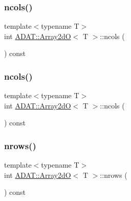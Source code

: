 \subsubsection{\texorpdfstring{ncols()}{ncols()}\hspace{0.1cm}{\footnotesize\ttfamily [1/2]}}
{\footnotesize\ttfamily template$<$typename T$>$ \\
int \mbox{\hyperlink{classADAT_1_1Array2dO}{A\+D\+A\+T\+::\+Array2dO}}$<$ T $>$\+::ncols (\begin{DoxyParamCaption}{ }\end{DoxyParamCaption}) const\hspace{0.3cm}{\ttfamily [inline]}}

\mbox{\label{classADAT_1_1Array2dO_a68d75259fbc18eb14504e3b6d74f2484}} 
\subsubsection{\texorpdfstring{ncols()}{ncols()}\hspace{0.1cm}{\footnotesize\ttfamily [2/2]}}
{\footnotesize\ttfamily template$<$typename T$>$ \\
int \mbox{\hyperlink{classADAT_1_1Array2dO}{A\+D\+A\+T\+::\+Array2dO}}$<$ T $>$\+::ncols (\begin{DoxyParamCaption}{ }\end{DoxyParamCaption}) const\hspace{0.3cm}{\ttfamily [inline]}}

\mbox{\label{classADAT_1_1Array2dO_a8c2e98f898dd0406c9ac9c9e04b1eb0d}} 
\subsubsection{\texorpdfstring{nrows()}{nrows()}\hspace{0.1cm}{\footnotesize\ttfamily [1/2]}}
{\footnotesize\ttfamily template$<$typename T$>$ \\
int \mbox{\hyperlink{classADAT_1_1Array2dO}{A\+D\+A\+T\+::\+Array2dO}}$<$ T $>$\+::nrows (\begin{DoxyParamCaption}{ }\end{DoxyParamCaption}) const\hspace{0.3cm}{\ttfamily [inline]}}



